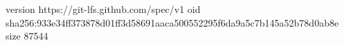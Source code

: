 version https://git-lfs.github.com/spec/v1
oid sha256:933e34ff373878d01ff3d58691aaca500552295f6da9a5c7b145a52b78d0ab8e
size 87544
